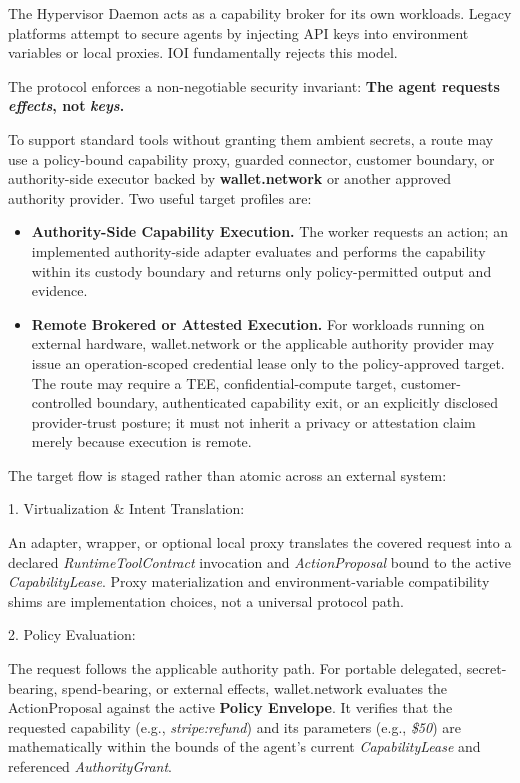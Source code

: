 \documentclass[
  11pt,
]{article}
\providecommand{\tightlist}{%
  \setlength{\itemsep}{0pt}\setlength{\parskip}{0pt}}
\begin{document}
The Hypervisor Daemon acts as a capability broker for its own workloads.
Legacy platforms attempt to secure agents by injecting
API keys into environment variables or local proxies. IOI fundamentally
rejects this model.

The protocol enforces a non-negotiable security invariant: \textbf{The
agent requests }\emph{\textbf{effects}}\textbf{, not
}\emph{\textbf{keys}}\textbf{. }

To support standard tools without granting them ambient secrets, a route may
use a policy-bound capability proxy, guarded connector, customer boundary, or
authority-side executor backed by \textbf{wallet.network} or another approved
authority provider. Two useful target profiles are:

\begin{itemize}
\tightlist
\item
  \textbf{Authority-Side Capability Execution.} The worker requests an action;
  an implemented authority-side adapter evaluates and performs the capability
  within its custody boundary and returns only policy-permitted output and
  evidence.
\item
  \textbf{Remote Brokered or Attested Execution.} For workloads running on
  external hardware, wallet.network or the applicable authority provider may
  issue an operation-scoped credential lease only to the policy-approved
  target. The route may require a TEE, confidential-compute target,
  customer-controlled boundary, authenticated capability exit, or an explicitly
  disclosed provider-trust posture; it must not inherit a privacy or attestation
  claim merely because execution is remote.
\end{itemize}

The target flow is staged rather than atomic across an external system:

1. Virtualization \& Intent Translation:

An adapter, wrapper, or optional local proxy translates the covered request into
a declared \emph{RuntimeToolContract} invocation and \emph{ActionProposal}
bound to the active \emph{CapabilityLease}. Proxy materialization and
environment-variable compatibility shims are implementation choices, not a
universal protocol path.

2. Policy Evaluation:

The request follows the applicable authority path. For portable delegated,
secret-bearing, spend-bearing, or external effects, wallet.network evaluates
the ActionProposal against the active \textbf{Policy Envelope}.
It verifies that the requested capability (e.g., \emph{stripe:refund})
and its parameters (e.g., \emph{\$50}) are mathematically within the
bounds of the agent's current \emph{CapabilityLease} and referenced
\emph{AuthorityGrant}.
\end{document}
